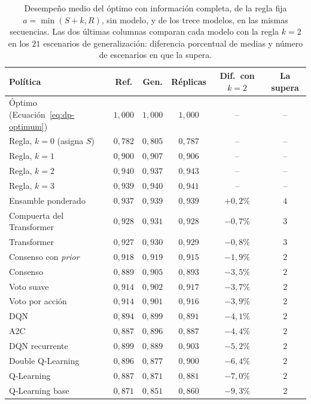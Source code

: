 \documentclass[../00_Main/Main.tex]{subfiles}
\begin{document}
\begin{table}[H]
\centering
\caption[Regla fija y modelos frente al \'optimo]{Desempe\~no medio del
\'optimo con informaci\'on completa, de la regla fija $a = \min(S + k, R)$,
sin modelo, y de los trece modelos, en las mismas secuencias. Las dos
\'ultimas columnas comparan cada modelo con la regla $k = 2$ en los $21$
escenarios de generalizaci\'on: diferencia porcentual de medias y n\'umero
de escenarios en que la supera.}
\label{tab:fixed-rule}
\small
\begin{tabular}{@{}lccccc@{}}
\toprule
\textbf{Pol\'itica} & \textbf{Ref.} & \textbf{Gen.} & \textbf{R\'eplicas} & \textbf{Dif.\ con $k = 2$} & \textbf{La supera} \\
\midrule
\'Optimo (Ecuaci\'on~\eqref{eq:dp-optimum}) & $1{,}000$ & $1{,}000$ & $1{,}000$ & -- & -- \\
Regla, $k = 0$ (asigna $S$) & $0{,}782$ & $0{,}805$ & $0{,}787$ & -- & -- \\
Regla, $k = 1$ & $0{,}900$ & $0{,}907$ & $0{,}906$ & -- & -- \\
Regla, $k = 2$ & $0{,}940$ & $0{,}937$ & $0{,}943$ & -- & -- \\
Regla, $k = 3$ & $0{,}939$ & $0{,}940$ & $0{,}941$ & -- & -- \\
\midrule
Ensamble ponderado & $0{,}937$ & $0{,}939$ & $0{,}939$ & $+0{,}2\%$ & $4$ \\
Compuerta del Transformer & $0{,}928$ & $0{,}931$ & $0{,}928$ & $-0{,}7\%$ & $3$ \\
Transformer & $0{,}927$ & $0{,}930$ & $0{,}929$ & $-0{,}8\%$ & $3$ \\
Consenso con \emph{prior} & $0{,}918$ & $0{,}919$ & $0{,}915$ & $-1{,}9\%$ & $2$ \\
Consenso & $0{,}889$ & $0{,}905$ & $0{,}893$ & $-3{,}5\%$ & $2$ \\
Voto suave & $0{,}914$ & $0{,}902$ & $0{,}917$ & $-3{,}7\%$ & $2$ \\
Voto por acci\'on & $0{,}914$ & $0{,}901$ & $0{,}916$ & $-3{,}9\%$ & $2$ \\
DQN & $0{,}894$ & $0{,}899$ & $0{,}891$ & $-4{,}1\%$ & $2$ \\
A2C & $0{,}887$ & $0{,}896$ & $0{,}887$ & $-4{,}4\%$ & $2$ \\
DQN recurrente & $0{,}899$ & $0{,}889$ & $0{,}903$ & $-5{,}2\%$ & $2$ \\
Double Q-Learning & $0{,}896$ & $0{,}877$ & $0{,}900$ & $-6{,}4\%$ & $2$ \\
Q-Learning & $0{,}887$ & $0{,}871$ & $0{,}881$ & $-7{,}0\%$ & $2$ \\
Q-Learning base & $0{,}871$ & $0{,}851$ & $0{,}860$ & $-9{,}3\%$ & $2$ \\
\bottomrule
\end{tabular}
\end{table}
\end{document}
